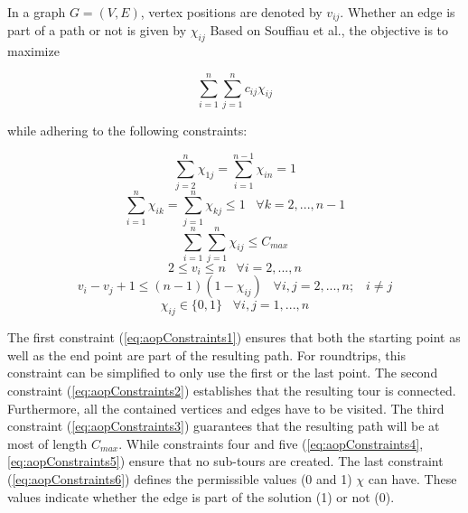 In a graph $G=(V,E)$, vertex positions are denoted by $v_{ij}$.
Whether an edge is part of a path or not is given by $\chi_{ij}$
Based on Souffiau et al., the objective is to maximize 

\begin{equation}
	\label{eq:aopMaximize}
	\sum_{i=1}^{n} \sum_{j=1}^{n} c_{ij} \chi_{ij}
\end{equation}

while adhering to the following constraints:


\begin{equation}
	\label{eq:aopConstraints1}
	\sum_{j=2}^{n} \chi_{1j} = \sum_{i=1}^{n-1} \chi_{in} = 1
\end{equation}
\begin{equation}
	\label{eq:aopConstraints2}
	\sum_{i=1}^{n} \chi_{ik} =  \sum_{j=1}^{n} \chi_{kj} \leq 1 \;\;\; \forall k = 2,...,n-1
\end{equation}
\begin{equation}
	\label{eq:aopConstraints3}
	\sum_{i=1}^{n}  \sum_{j=1}^{n} \chi_{ij} \leq C_{max}
\end{equation}
\begin{equation}
	\label{eq:aopConstraints4}
	2 \leq v_i \leq n \;\;\; \forall i = 2,...,n
\end{equation}
\begin{equation}
	\label{eq:aopConstraints5}
	v_i - v_j + 1 \leq (n-1)(1-\chi_{ij}) \;\;\; \forall i,j = 2,...,n; \;\;\; i \neq j
\end{equation}
\begin{equation}
	\label{eq:aopConstraints6}
	\chi_{ij} \in \{0,1\} \;\;\; \forall i,j=1,...,n
\end{equation}


The first constraint (\ref{eq:aopConstraints1}) ensures that both the starting point as well as the end point are part of the resulting path.
For roundtrips, this constraint can be simplified to only use the first or the last point.
The second constraint (\ref{eq:aopConstraints2}) establishes that the resulting tour is connected.
Furthermore, all the contained vertices and edges have to be visited.
The third constraint (\ref{eq:aopConstraints3}) guarantees that the resulting path will be at most of length $C_{max}$.
While constraints four and five (\ref{eq:aopConstraints4}, \ref{eq:aopConstraints5}) ensure that no sub-tours are created.
The last constraint (\ref{eq:aopConstraints6}) defines the permissible values (0 and 1) $\chi$ can have.
These values indicate whether the edge is part of the solution (1) or not (0). 


